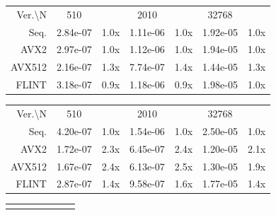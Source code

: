 \documentclass[a4paper]{article}
\begin{document}
\begin{table}[h!]
    \centering
    
    \begin{tabular}{|r|*{3}{c c|}}
        \hline
        \rowcolor{myGray} 
        \multicolumn{7}{|c|}{\textsc{Cascade Lake}} \\

        \hline
        \rowcolor{myGray}
        Ver.\textbackslash N & 510 & & 2010 & & 32768 & \\
        \hline
        \cellcolor{myGray} Seq. & 2.84e-07 & 1.0x & 1.11e-06 & 1.0x & 1.92e-05 & 1.0x \\
        \hline
        \cellcolor{myGray} AVX2 & 2.97e-07 & 1.0x & 1.12e-06 & 1.0x & 1.94e-05 & 1.0x \\
        \hline
        \cellcolor{myGray} AVX512 & 2.16e-07 & 1.3x & 7.74e-07 & 1.4x & 1.44e-05 & 1.3x \\
        \hline
        \cellcolor{myGray} FLINT & 3.18e-07 & 0.9x & 1.18e-06 & 0.9x & 1.98e-05 & 1.0x \\
        \hline
    \end{tabular}

    \begin{tabular}{|r|*{3}{c c|}}
        \hline
        \rowcolor{myGray} 
        \multicolumn{7}{|c|}{\textsc{Ice Lake}} \\

        \hline
        \rowcolor{myGray}
        Ver.\textbackslash N & 510 & & 2010 & & 32768 & \\
        \hline
        \cellcolor{myGray} Seq. & 4.20e-07 & 1.0x & 1.54e-06 & 1.0x & 2.50e-05 & 1.0x \\
        \hline
        \cellcolor{myGray} AVX2 & 1.72e-07 & 2.3x & 6.45e-07 & 2.4x & 1.20e-05 & 2.1x \\
        \hline
        \cellcolor{myGray} AVX512 & 1.67e-07 & 2.4x & 6.13e-07 & 2.5x & 1.30e-05 & 1.9x \\
        \hline
        \cellcolor{myGray} FLINT & 2.87e-07 & 1.4x & 9.58e-07 & 1.6x & 1.77e-05 & 1.4x \\
        \hline
    \end{tabular}

    \begin{tabular}{|r|*{3}{c c|}}
        \hline
        \rowcolor{myGray}
        \multicolumn{7}{|c|}{\textsc{Zen 4}} \\


\end{tabular}
\end{table}
\end{document}
